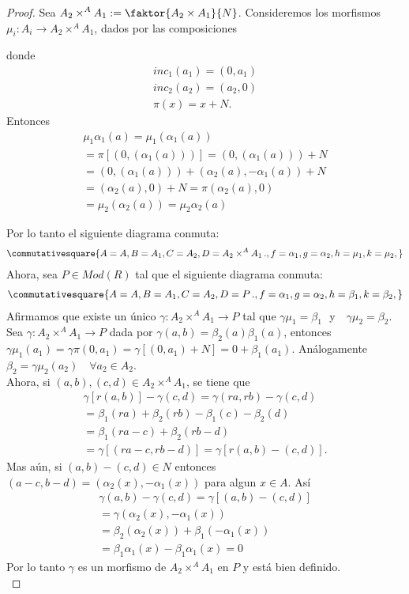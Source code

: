 \documentclass{article}
\begin{document}
\begin{enumerate}[label=\textbf{Ej \arabic*.}]
\begin{proof}
Sea $\displaystyle A_2\times^A A_1:=\faktor{A_2\times A_1}{N}$. Consideremos los morfismos\\ $\mu_i\colon A_i\longrightarrow A_2\times^AA_1$, 
dados por las composiciones\\  donde 
\begin{align*}
inc_1(a_1)=(0,a_1)\\
inc_2(a_2)=(a_2,0)\\
\pi(x)=x+N.
\end{align*}
Entonces 
\begin{align*}
\mu_1\alpha_1(a)=\mu_1(\alpha_1(a))\\
=\pi[(0,(\alpha_1(a)))]
=(0,(\alpha_1(a)))+N\\
=(0,(\alpha_1(a)))+(\alpha_2(a),-\alpha_1(a))+N\\
=(\alpha_2(a),0)+N
=\pi(\alpha_2(a),0)\\
=\mu_2(\alpha_2(a))
=\mu_2\alpha_2(a)
\end{align*}

Por lo tanto el siguiente diagrama conmuta:
\begin{align*}
\commutativesquare{A=A,B=A_1,C=A_2,D=A_2\times^AA_1\,.,f=\alpha_1,g=\alpha_2,h=\mu_1,k=\mu_2,}
\end{align*}
Ahora, sea $P\in Mod(R)$ tal que el siguiente diagrama conmuta:
\begin{align*}
\commutativesquare{A=A,B=A_1,C=A_2,D=P\,.,f=\alpha_1,g=\alpha_2,h=\beta_1,k=\beta_2,}
\end{align*}
Afirmamos que existe un único $\gamma\colon A_2\times^AA_1\longrightarrow P$ tal que $\gamma\mu_1=\beta_1$\,\, y \,\, 
$\gamma\mu_2=\beta_2$. Sea $\gamma\colon A_2\times^AA_1\longrightarrow P$ dada por $\gamma(a,b)=\beta_2(a)\beta_1(a)$,
 entonces $\gamma\mu_1(a_1)=\gamma\pi(0,a_1)=\gamma[(0,a_1)+N]=0+\beta_1(a_1)$. Análogamente
$\beta_2=\gamma\mu_2(a_2)\quad \forall a_2\in A_2$.\\

Ahora, si $(a,b),(c,d)\in A_2\times^AA_1$, se tiene que 
\begin{align*}
\gamma[r(a,b)]-\gamma(c,d)=\gamma(ra,rb)-\gamma(c,d)\\
=\beta_1(ra)+\beta_2(rb)-\beta_1(c)-\beta_2(d)\\
=\beta_1(ra-c)+\beta_2(rb-d)\\
=\gamma[(ra-c,rb-d)]=\gamma[r(a,b)-(c,d)].
\end{align*}
Mas aún, si $(a,b)-(c,d)\in N$ entonces $(a-c,b-d)=(\alpha_2(x),-\alpha_1(x))$ para algun $x\in A$. Así 
\begin{align*}
\gamma(a,b)-\gamma(c,d)=\gamma[(a,b)-(c,d)]\\
=\gamma(\alpha_2(x),-\alpha_1(x))\\
=\beta_2(\alpha_2(x))+\beta_1(-\alpha_1(x))\\
=\beta_1\alpha_1(x)-\beta_1\alpha_1(x)=0
\end{align*}
Por lo tanto $\gamma$ es un morfismo de $A_2\times^AA_1$ en $P$ y está bien definido.\\


\end{proof}
\end{enumerate}
\end{document}

